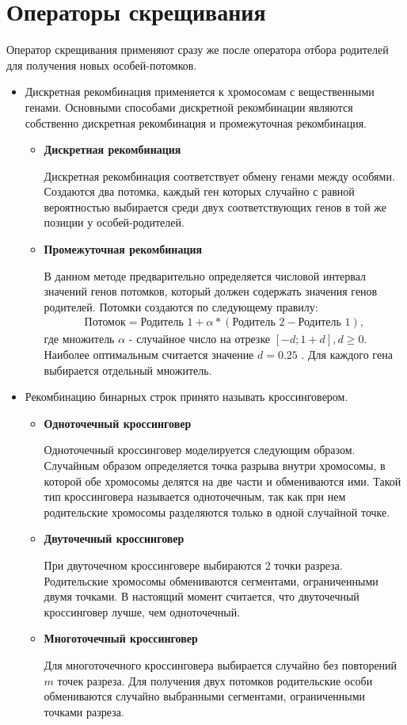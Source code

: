 \section{Операторы скрещивания}
Оператор скрещивания применяют сразу же после оператора отбора родителей для получения новых особей-потомков.
\begin{itemize}[label=$\ast$]
	\item {}

Дискретная рекомбинация применяется к хромосомам с вещественными генами. Основными способами дискретной рекомбинации являются собственно дискретная рекомбинация и промежуточная рекомбинация.
	\begin{itemize}[label=$-$]
		\item \textbf{Дискретная рекомбинация}

	Дискретная рекомбинация соответствует обмену генами между особями. Создаются два потомка, каждый ген которых случайно с равной вероятностью выбирается среди двух соответствующих генов в той же позиции у особей-родителей.
		\item \textbf{Промежуточная рекомбинация}

В данном методе предварительно определяется числовой интервал значений генов потомков, который должен содержать значения генов родителей. Потомки создаются по следующему правилу:
\begin{eqnarray*}
	\textrm{Потомок} = \textrm{Родитель 1} + \alpha \ast (\textrm{Родитель 2} - \textrm{Родитель 1}),
\end{eqnarray*}
где множитель $\alpha$ - случайное число на отрезке $[-d; 1 + d], d \geq 0$.
Наиболее оптимальным считается значение $d = 0.25$ \cite{algGA}. Для каждого гена выбирается отдельный множитель. 
	\end{itemize}
	\item {}

Рекомбинацию бинарных строк принято называть кроссинговером.
	\begin{itemize}[label=$-$]
		\item \textbf{Одноточечный кроссинговер}

Одноточечный кроссинговер моделируется следующим образом. Случайным образом определяется точка разрыва внутри хромосомы, в которой обе хромосомы делятся на две части и обмениваются ими. Такой тип кроссинговера называется одноточечным, так как при нем родительские хромосомы разделяются только в одной случайной точке.
		\item \textbf{Двуточечный кроссинговер}

При двуточечном кроссинговере выбираются 2 точки разреза. Родительские хромосомы обмениваются сегментами, ограниченными двумя точками. В настоящий момент считается, что двуточечный кроссинговер лучше, чем одноточечный. \cite{algGA}
		\item \textbf{Многоточечный кроссинговер}

Для многоточечного кроссинговера выбирается случайно без повторений $m$ точек разреза. Для получения двух потомков родительские особи обмениваются случайно выбранными сегментами, ограниченными точками разреза.
	\end{itemize}
\end{itemize}


